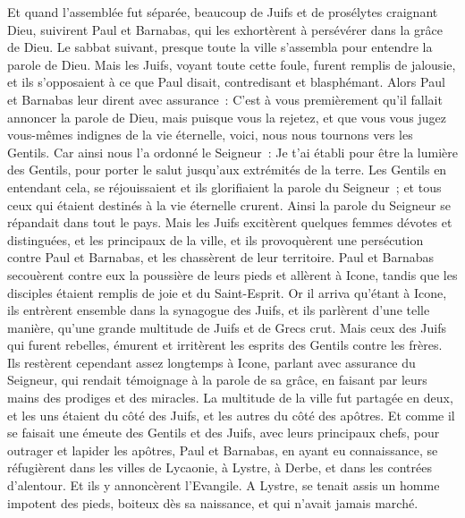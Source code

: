 \begin{multicols}{2}
Et quand l'assemblée fut séparée, beaucoup de Juifs et de prosélytes craignant Dieu, suivirent Paul et Barnabas, qui les exhortèrent à persévérer dans la grâce de Dieu.
Le sabbat suivant, presque toute la ville s'assembla pour entendre la parole de Dieu.
Mais les Juifs, voyant toute cette foule, furent remplis de jalousie, et ils s'opposaient à ce que Paul disait, contredisant et blasphémant.
Alors Paul et Barnabas leur dirent avec assurance~: C'est à vous premièrement qu'il fallait annoncer la parole de Dieu, mais puisque vous la rejetez, et que vous vous jugez vous-mêmes indignes de la vie éternelle, voici, nous nous tournons vers les Gentils.
Car ainsi nous l'a ordonné le Seigneur~: Je t'ai établi pour être la lumière des Gentils, pour porter le salut jusqu'aux extrémités de la terre.
Les Gentils en entendant cela, se réjouissaient et ils glorifiaient la parole du Seigneur~; et tous ceux qui étaient destinés à la vie éternelle crurent.
Ainsi la parole du Seigneur se répandait dans tout le pays.
Mais les Juifs excitèrent quelques femmes dévotes et distinguées, et les principaux de la ville, et ils provoquèrent une persécution contre Paul et Barnabas, et les chassèrent de leur territoire.
Paul et Barnabas secouèrent contre eux la poussière de leurs pieds et allèrent à Icone,
tandis que les disciples étaient remplis de joie et du Saint-Esprit.
\VerseOne{}Or il arriva qu'étant à Icone, ils entrèrent ensemble dans la synagogue des Juifs, et ils parlèrent d'une telle manière, qu'une grande multitude de Juifs et de Grecs crut. 
Mais ceux des Juifs qui furent rebelles, émurent et irritèrent les esprits des Gentils contre les frères.
Ils restèrent cependant assez longtemps à Icone, parlant avec assurance du Seigneur, qui rendait témoignage à la parole de sa grâce, en faisant par leurs mains des prodiges et des miracles.
La multitude de la ville fut partagée en deux, et les uns étaient du côté des Juifs, et les autres du côté des apôtres.
Et comme il se faisait une émeute des Gentils et des Juifs, avec leurs principaux chefs, pour outrager et lapider les apôtres,
Paul et Barnabas, en ayant eu connaissance, se réfugièrent dans les villes de Lycaonie, à Lystre, à Derbe, et dans les contrées d'alentour.
Et ils y annoncèrent l'Evangile.
A Lystre, se tenait assis un homme impotent des pieds, boiteux dès sa naissance, et qui n'avait jamais marché.

\end{multicols}
